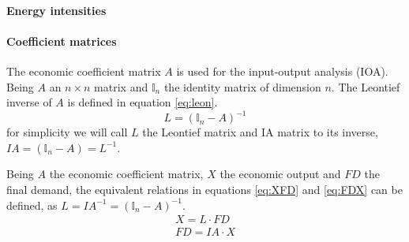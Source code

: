 \paragraph{Energy intensities}

\paragraph{Coefficient matrices}
The economic coefficient matrix $A$ is used for the input-output analysis (IOA). Being $A$ an $n\times n$ matrix and $\mathbb{I}_n$ the identity matrix of dimension $n$. The Leontief inverse of $A$ is defined in equation \eqref{eq:leon}.
\begin{equation}
    L=\left(\mathbb{I}_n-A\right)^{-1}
    \label{eq:leon}
\end{equation}
for simplicity we will call $L$ the Leontief matrix and IA matrix to its inverse, $IA=\left(\mathbb{I}_n-A\right)=L^{-1}$. 

Being $A$ the economic coefficient matrix, $X$ the economic output and $FD$ the final demand, the equivalent relations in equations \eqref{eq:XFD} and \eqref{eq:FDX} can be defined, as $L=IA^{-1}=\left(\mathbb{I}_n-A\right)^{-1}$.
\begin{gather}
X=L\cdot FD\label{eq:XFD}\\
FD=IA\cdot X\label{eq:FDX}
\end{gather}

